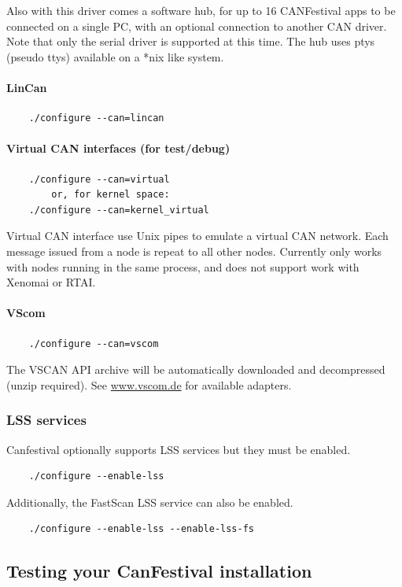 \documentclass[12pt,english,a4paper]{book}
\begin{document}
Also with this driver comes a software hub, for up to 16 CANFestival apps to 
be connected on a single PC, with an optional connection to another CAN driver.
Note that only the serial driver is supported at this time.  The hub uses ptys 
(pseudo ttys) available on a *nix like system.

\paragraph{LinCan}
\begin{verbatim}
	./configure --can=lincan
\end{verbatim}

\paragraph{Virtual CAN interfaces (for test/debug)}
\begin{verbatim}
	./configure --can=virtual
		or, for kernel space:
	./configure --can=kernel_virtual
\end{verbatim}
Virtual CAN interface use Unix pipes to emulate a virtual CAN network.
Each message issued from a node is repeat to all other nodes. Currently
only works with nodes running in the same process, and does not support
work with Xenomai or RTAI.

\paragraph{VScom}
\begin{verbatim}
	./configure --can=vscom
\end{verbatim}
The VSCAN API archive will be automatically downloaded and decompressed (unzip required). See \href{http://www.vscom.de/1_1_05.htm}{www.vscom.de} for available adapters.

\subsubsection{LSS services}
Canfestival optionally supports LSS services but they must be enabled.
\begin{verbatim}
	./configure --enable-lss
\end{verbatim}

Additionally, the FastScan LSS service can also be enabled.
\begin{verbatim}
	./configure --enable-lss --enable-lss-fs
\end{verbatim}

\subsection{Testing your CanFestival installation}
\end{document}
